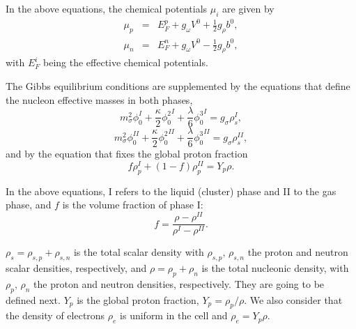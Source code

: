 \documentclass[epj]{svjour}
\begin{document}
 In the above equations, the chemical potentials $\mu_i$ are given by
\begin{eqnarray}
\mu_p&=& E^p_{F}+g_{\omega} V^{0}+\frac{1}{2}g_{\rho} b^{0}, \label{mup}\\
\mu_{n}&=&E^n_{F}+g_{\omega} V^{0}-\frac{1}{2}g_{\rho} b^{0}\label{mun},
\end{eqnarray}
with $E^i_{F}$ being the effective chemical potentials.


 The Gibbs equilibrium conditions are supplemented by the equations that define the nucleon effective masses in both phases,
\begin{equation}
m_\sigma^2 \phi_0^I + \frac{\kappa}{2} {\phi_0^2}^I 
+\frac{\lambda}{6}{\phi_0^3}^I = g_\sigma \rho_s^I,\label{gibbs3}
\end{equation}
\begin{equation}
m_\sigma^2 \phi_0^{II} + \frac{\kappa}{2} {\phi_0^2}^{II} 
+\frac{\lambda}{6}{\phi_0^3}^{II} = g_\sigma \rho_s^{II},\label{gibbs4}
\end{equation}
 and by the equation that fixes the global proton fraction
\begin{equation}
f\rho_p^I + (1-f) \rho_p^{II} = Y_p \rho. \label{gibbs7}
\end{equation}

In the above equations,  I refers to the liquid (cluster) phase and
II to the gas phase, and $f$ is the volume fraction of 
phase I: 
\begin{equation}
f= \frac{\rho -\rho^{II}}{\rho^I-\rho^{II}}.
\end{equation}

 $\rho_s=\rho_{s,p}+\rho_{s,n}$ is the total scalar density
with $\rho_{s,p}, \, \rho_{s,n}$ the proton and
neutron scalar densities, respectively, and $\rho=\rho_p+\rho_n$ is the total nucleonic density, with $\rho_{p}, \, \rho_{n}$ the proton and
neutron densities, respectively. They are going to be defined next. $Y_p$ is the global proton fraction, $Y_p=\rho_p/\rho$. We also consider that the density of electrons $\rho_e$ is uniform in the
cell and $\rho_e=Y_p
\rho$.
\end{document}
